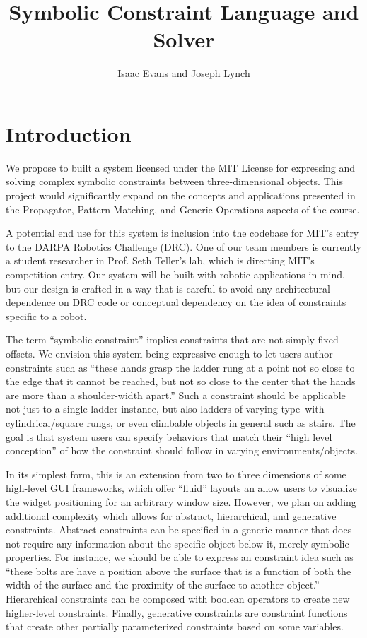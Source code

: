 \documentclass[a4paper,10pt]{article}
\title{Symbolic Constraint Language and Solver}
\author{Isaac Evans and Joseph Lynch}
\begin{document}
\maketitle

\section{Introduction}

We propose to built a system licensed under the MIT License for expressing and 
solving complex symbolic constraints between three-dimensional objects. This 
project would significantly expand on the concepts and applications presented in 
the Propagator, Pattern Matching, and Generic Operations aspects of the course.

A potential end use for this system is inclusion into the codebase for MIT’s 
entry to the DARPA Robotics Challenge (DRC). One of our team members is 
currently a student researcher in Prof. Seth Teller’s lab, which is directing 
MIT’s competition entry. Our system will be built with robotic applications in 
mind, but our design is crafted in a way that is careful to avoid any 
architectural dependence on DRC code or conceptual dependency on the idea of 
constraints specific to a robot.

The term “symbolic constraint” implies constraints that are not simply fixed 
offsets. We envision this system being expressive enough to let users author 
constraints such as “these hands grasp the ladder rung at a point not so close 
to the edge that it cannot be reached, but not so close to the center that the 
hands are more than a shoulder-width apart.” Such a constraint should be 
applicable not just to a single ladder instance, but also ladders of varying 
type--with cylindrical/square rungs, or even climbable objects in general such 
as stairs. The goal is that system users can specify behaviors that match their 
“high level conception” of how the constraint should follow in varying 
environments/objects.

In its simplest form, this is an extension from two to three dimensions of some 
high-level GUI frameworks, which offer “fluid” layouts an allow users to 
visualize the widget positioning for an arbitrary window size. However, we plan 
on adding additional complexity which allows for abstract, hierarchical, and 
generative constraints.  Abstract constraints can be specified in a generic 
manner that does not require any information about the specific object below it, 
merely symbolic properties. For instance, we should be able to express an 
constraint idea such as “these bolts are have a position above the surface that 
is a function of both the width of the surface and the proximity of the 
surface to another object.” Hierarchical constraints can be composed with 
boolean operators to create new higher-level constraints. Finally, generative 
constraints are constraint functions that create other partially parameterized 
constraints based on some variables.
\end{document}
